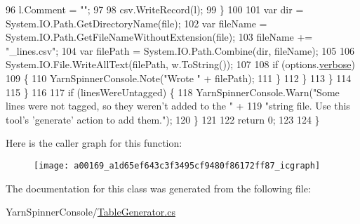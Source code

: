 \begin{DoxyCode}
96                             l.Comment = \textcolor{stringliteral}{""};
97 
98                             csv.WriteRecord(l);
99                         \}
100 
101                         var dir = System.IO.Path.GetDirectoryName(file);
102                         var fileName = System.IO.Path.GetFileNameWithoutExtension(file);
103                         fileName += \textcolor{stringliteral}{"\_lines.csv"};
104                         var filePath = System.IO.Path.Combine(dir, fileName);
105 
106                         System.IO.File.WriteAllText(filePath, w.ToString());
107 
108                         \textcolor{keywordflow}{if} (options.\hyperlink{a00041_ada4d83d1756918f362d55f6649b82b17}{verbose})
109                         \{
110                             YarnSpinnerConsole.Note(\textcolor{stringliteral}{"Wrote "} + filePath);
111                         \}
112                     \}
113                 \}
114 
115             \}
116 
117             \textcolor{keywordflow}{if} (linesWereUntagged) \{
118                 YarnSpinnerConsole.Warn(\textcolor{stringliteral}{"Some lines were not tagged, so they weren't added to the "} +
119                                \textcolor{stringliteral}{"string file. Use this tool's 'generate' action to add them."});
120             \}
121 
122             \textcolor{keywordflow}{return} 0;
123 
124         \}
\end{DoxyCode}


Here is the caller graph for this function\-:
\nopagebreak
\begin{figure}[H]
\begin{center}
\leavevmode
\texttt{[image: a00169\_a1d65ef643c3f3495cf9480f86172ff87\_icgraph]}
\end{center}
\end{figure}




The documentation for this class was generated from the following file\-:\begin{DoxyCompactItemize}
\item 
Yarn\-Spinner\-Console/\hyperlink{a00327}{Table\-Generator.\-cs}\end{DoxyCompactItemize}

